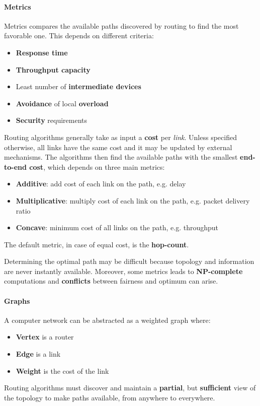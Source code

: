 \paragraph{Metrics} Metrics compares the available paths discovered by routing to find the most favorable one. This depends on different criteria:
\begin{itemize}
	\item \textbf{Response time}
	\item \textbf{Throughput capacity}
	\item Least number of \textbf{intermediate devices}
	\item \textbf{Avoidance} of local \textbf{overload}
	\item \textbf{Security} requirements
\end{itemize}
Routing algorithms generally take as input a \textbf{cost} per \textit{link}. Unless specified otherwise, all links have the same cost and it may be updated by external mechanisms. The algorithms then find the available paths with the smallest \textbf{end-to-end cost}, which depends on three main metrics:
\begin{itemize}
	\item \textbf{Additive}: add cost of each link on the path, e.g. delay
	\item \textbf{Multiplicative}: multiply cost of each link on the path, e.g. packet delivery ratio
	\item \textbf{Concave}: minimum cost of all links on the path, e.g. throughput
\end{itemize}
\begin{note}
	The default metric, in case of equal cost, is the \textbf{hop-count}.
\end{note}

Determining the optimal path may be difficult because topology and information are never instantly available. Moreover, some metrics leads to \textbf{NP-complete} computations and \textbf{conflicts} between fairness and optimum can arise.

\newpage
\paragraph{Graphs} A computer network can be abstracted as a weighted graph where:
\begin{itemize}
	\item \textbf{Vertex} is a router
	\item \textbf{Edge} is a link
	\item \textbf{Weight} is the cost of the link
\end{itemize}
Routing algorithms must discover and maintain a \textbf{partial}, but \textbf{sufficient} view of the topology to make paths available, from anywhere to everywhere.
\begin{figure}[!h]
	\hfil
	\hfil
\end{figure}

